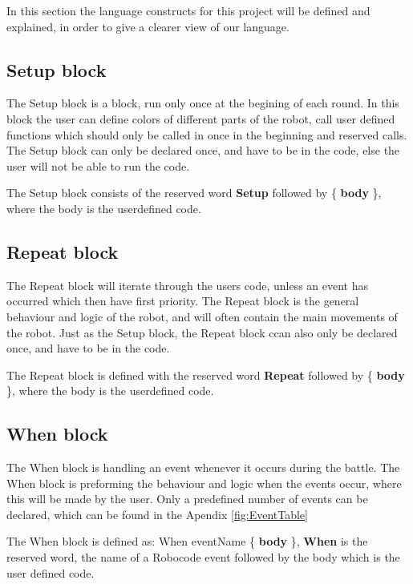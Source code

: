 In this section the language constructs for this project will be defined and explained, in order to give a clearer view of our language.

\subsection{Setup block}
The Setup block is a block, run only once at the begining of each round. In this block the user can define colors of different parts of the robot, call user defined functions which should only be called in once in the beginning and reserved calls. The Setup block can only be declared once, and have to be in the code, else the user will not be able to run the code.

\begin{defi}
The Setup block consists of the reserved word \textbf{Setup} followed by \{ \textbf{body} \}, where the body is the userdefined code. 
\end{defi}

\subsection{Repeat block}
The Repeat block will iterate through the users code, unless an event has occurred which then have first priority. The Repeat block is the general behaviour and logic of the robot, and will often contain the main movements of the robot. Just as the Setup block, the Repeat block ccan also only be declared once, and have to be in the code.

\begin{defi}
The Repeat block is defined with the reserved word \textbf{Repeat} followed by \{ \textbf{body} \}, where the body is the userdefined code.
\end{defi}

\subsection{When block}
The When block is handling an event whenever it occurs during the battle. The When block is preforming the behaviour and logic when the events occur, where this will be made by the user. Only a predefined number of events can be declared, which can be found in the Apendix \ref{fig:EventTable}

\begin{defi}
The When block is defined as: When eventName \{ \textbf{body} \}, \textbf{When} is the reserved word, the name of a Robocode event followed by the body which is the user defined code.
\end{defi}

